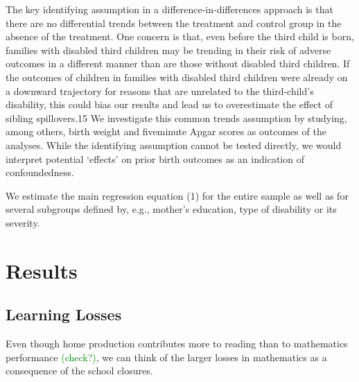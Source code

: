 
The key identifying assumption in a difference-in-differences approach is that there are no differential trends between the treatment and control group in the absence of the treatment. One concern is that, even before the third child is born, families with disabled third children may be trending in their risk of adverse outcomes in a different manner than are those without disabled third children. If the outcomes of children in families with disabled third children were already on a downward trajectory for reasons that are unrelated to the third-child’s disability, this could bias our results and lead us to overestimate the effect of sibling spillovers.15 We investigate this common trends assumption by studying, among others, birth weight and fiveminute Apgar scores as outcomes of the analyses. While the identifying assumption cannot be tested directly, we would interpret potential ‘effects’ on prior birth outcomes as an indication of confoundedness. 

We estimate the main regression equation (1) for the entire sample as well as for several subgroups defined by, e.g., mother’s education, type of disability or its severity.


\section{Results}\label{sec:results}

\subsection{Learning Losses}

Even though home production contributes more to reading than to mathematics performance \cite{black_recent_2010} \textcolor{green}{(check?)}, we can think of the larger losses in mathematics as a consequence of the school closures.


